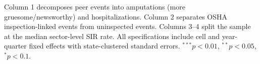 \begin{table}[htbp]
   \par \raggedright 
   Column 1 decomposes peer events into amputations (more gruesome/newsworthy) and hospitalizations. Column 2 separates OSHA inspection-linked events from uninspected events. Columns 3--4 split the sample at the median sector-level SIR rate. All specifications include cell and year-quarter fixed effects with state-clustered standard errors. $^{***}p<0.01$, $^{**}p<0.05$, $^{*}p<0.1$.
\end{table}


